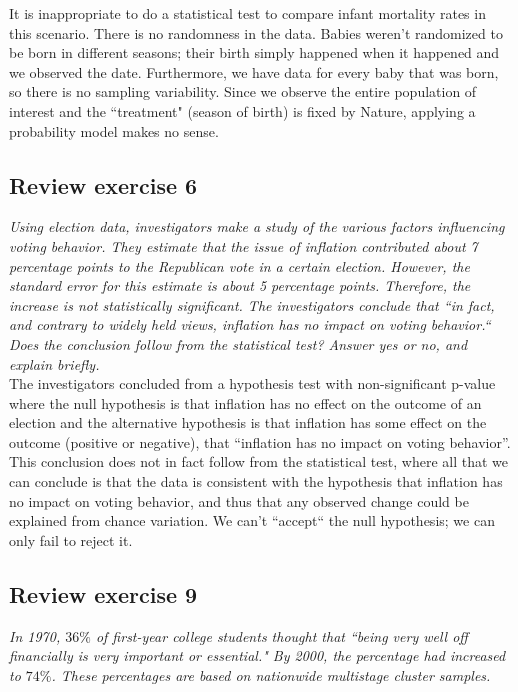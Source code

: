 \documentclass[11pt]{article}
\begin{document}
It is inappropriate to do a statistical test to compare infant mortality rates in this scenario.  There is no randomness in the data.  Babies weren't randomized to be born in different seasons; their birth simply happened when it happened and we observed the date.  Furthermore, we have data for every baby that was born, so there is no sampling variability.  Since we observe the entire population of interest and the ``treatment" (season of birth) is fixed by Nature, applying a probability model makes no sense.




\subsection*{Review exercise 6} %
\textit{Using election data, investigators make a study of the various factors influencing voting behavior.  They estimate that the issue of inflation contributed about 7 percentage points to the Republican vote in a certain election. However, the standard error for this estimate is about 5 percentage points. Therefore, the increase is not statistically significant.  The investigators conclude that ``in fact, and contrary to widely held views, inflation has no impact on voting behavior.`` Does the conclusion follow from the statistical test?  Answer yes or no, and explain briefly.} \\

The investigators concluded from a hypothesis test with non-significant p-value where the null hypothesis is that inflation has no effect on the outcome of an election and the alternative hypothesis is that inflation has some effect on the outcome (positive or negative), that ``inflation has no impact on voting behavior''. This conclusion does not in fact follow from the statistical test, where all that we can conclude is that the data is consistent with the hypothesis that inflation has no impact on voting behavior, and thus that any observed change could be explained from chance variation.  We can't ``accept`` the null hypothesis; we can only fail to reject it.



\subsection*{Review exercise 9} %
\textit{In 1970, $ 36\% $ of first-year college students thought that ``being very well off financially is very important or essential."
By 2000, the percentage had increased to $ 74\% $.
These percentages are based on nationwide multistage cluster samples.}
\end{document}
